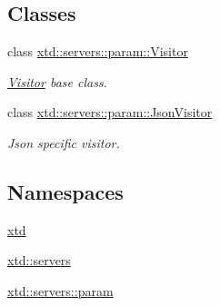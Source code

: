 \subsection*{Classes}
\begin{DoxyCompactItemize}
\item 
class \hyperlink{classxtd_1_1servers_1_1param_1_1Visitor}{xtd\-::servers\-::param\-::\-Visitor}
\begin{DoxyCompactList}\small\item\em \hyperlink{classxtd_1_1servers_1_1param_1_1Visitor}{Visitor} base class. \end{DoxyCompactList}\item 
class \hyperlink{classxtd_1_1servers_1_1param_1_1JsonVisitor}{xtd\-::servers\-::param\-::\-Json\-Visitor}
\begin{DoxyCompactList}\small\item\em Json specific visitor. \end{DoxyCompactList}\end{DoxyCompactItemize}
\subsection*{Namespaces}
\begin{DoxyCompactItemize}
\item 
\hyperlink{namespacextd}{xtd}
\item 
\hyperlink{namespacextd_1_1servers}{xtd\-::servers}
\item 
\hyperlink{namespacextd_1_1servers_1_1param}{xtd\-::servers\-::param}
\end{DoxyCompactItemize}
